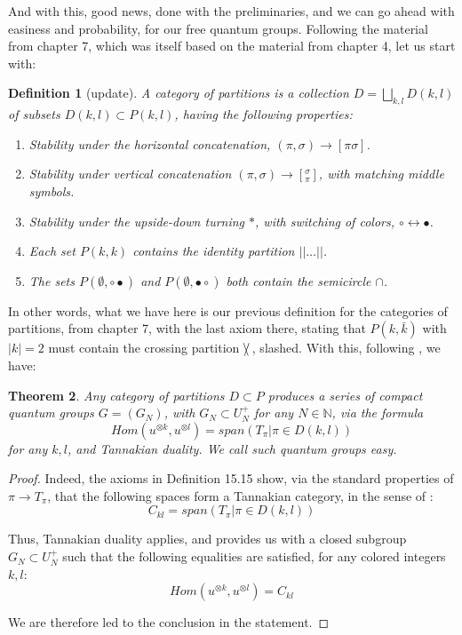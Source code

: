 \documentclass[12pt]{amsbook}
\newtheorem{theorem}{Theorem}[chapter]
\newtheorem{definition}[theorem]{Definition}
\begin{document}
And with this, good news, done with the preliminaries, and we can go ahead with easiness and probability, for our free quantum groups. Following the material from chapter 7, which was itself based on the material from chapter 4, let us start with:

\begin{definition}[update]
A category of partitions is a collection $D=\bigsqcup_{k,l}D(k,l)$ of subsets $D(k,l)\subset P(k,l)$, having the following properties:
\begin{enumerate}
\item Stability under the horizontal concatenation, $(\pi,\sigma)\to[\pi\sigma]$.

\item Stability under vertical concatenation $(\pi,\sigma)\to[^\sigma_\pi]$, with matching middle symbols.

\item Stability under the upside-down turning $*$, with switching of colors, $\circ\leftrightarrow\bullet$.

\item Each set $P(k,k)$ contains the identity partition $||\ldots||$.

\item The sets $P(\emptyset,\circ\bullet)$ and $P(\emptyset,\bullet\circ)$ both contain the semicircle $\cap$.
\end{enumerate}
\end{definition} 

In other words, what we have here is our previous definition for the categories of partitions, from chapter 7, with the last axiom there, stating that $P(k,\bar{k})$ with $|k|=2$ must contain the crossing partition $\slash\hskip-2.0mm\backslash\,$, slashed. With this, following \cite{bsp}, we have:

\begin{theorem}
Any category of partitions $D\subset P$ produces a series of compact quantum groups $G=(G_N)$, with $G_N\subset U_N^+$ for any $N\in\mathbb N$, via the formula
$$Hom(u^{\otimes k},u^{\otimes l})=span\left(T_\pi\Big|\pi\in D(k,l)\right)$$
for any $k,l$, and Tannakian duality. We call such quantum groups easy.
\end{theorem}

\begin{proof}
Indeed, the axioms in Definition 15.15 show, via the standard properties of $\pi\to T_\pi$, that the following spaces form a Tannakian category, in the sense of \cite{wo2}:
$$C_{kl}=span\left(T_\pi\Big|\pi\in D(k,l)\right)$$

Thus, Tannakian duality applies, and provides us with a closed subgroup $G_N\subset U_N^+$ such that the following equalities are satisfied, for any colored integers $k,l$:
$$Hom(u^{\otimes k},u^{\otimes l})=C_{kl}$$

We are therefore led to the conclusion in the statement.
\end{proof}
\end{document}
